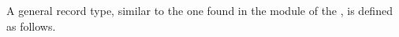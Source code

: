 A general  record type, similar to the one found in the  module of the \agdastdlib, is defined as follows.
\ccpad
\begin{code}%
\>[0]\AgdaSpace{}%
\AgdaSpace{}%
\AgdaSymbol{\{}\AgdaSpace{}%
\AgdaSpace{}%
\AgdaSymbol{:}\AgdaSpace{}%
\AgdaSymbol{\}}\AgdaSpace{}%
\AgdaSymbol{(}\AgdaSpace{}%
\AgdaSymbol{:}\AgdaSpace{}%
\AgdaSpace{}%
\AgdaSymbol{)}\AgdaSpace{}%
\AgdaSymbol{:}\AgdaSpace{}%
\AgdaSpace{}%
\AgdaSpace{}%
\AgdaSpace{}%
%
\>[50]\<%
\\
\>[0][@{}l@{\AgdaIndent{0}}]%
\>[1]\AgdaSpace{}%
\<%
\\
%
\>[1]\AgdaSpace{}%
\AgdaSpace{}%
\AgdaSymbol{:}\AgdaSpace{}%
\<%
\\
\>[0]\AgdaSpace{}%
\<%
\end{code}
\scpad
